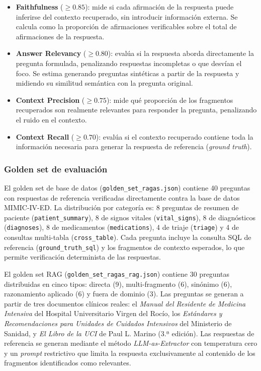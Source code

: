 \begin{itemize}[nosep, leftmargin=*]
  \item \textbf{Faithfulness} ($\geq 0.85$): mide si cada afirmación de la
    respuesta puede inferirse del contexto recuperado, sin introducir
    información externa. Se calcula como la proporción de afirmaciones
    verificables sobre el total de afirmaciones de la respuesta.
  \item \textbf{Answer Relevancy} ($\geq 0.80$): evalúa si la respuesta
    aborda directamente la pregunta formulada, penalizando respuestas
    incompletas o que desvían el foco. Se estima generando preguntas
    sintéticas a partir de la respuesta y midiendo su similitud semántica
    con la pregunta original.
  \item \textbf{Context Precision} ($\geq 0.75$): mide qué proporción de
    los fragmentos recuperados son realmente relevantes para responder la
    pregunta, penalizando el ruido en el contexto.
  \item \textbf{Context Recall} ($\geq 0.70$): evalúa si el contexto
    recuperado contiene toda la información necesaria para generar la
    respuesta de referencia (\textit{ground truth}).
\end{itemize}

\subsubsection{Golden set de evaluación}
\label{sec:golden_set}

El golden set de base de datos (\texttt{golden\_set\_ragas.json}) contiene
40 preguntas con respuestas de referencia verificadas directamente contra
la base de datos MIMIC-IV-ED. La distribución por categoría es:
8 preguntas de resumen de paciente (\texttt{patient\_summary}),
8 de signos vitales (\texttt{vital\_signs}),
8 de diagnósticos (\texttt{diagnoses}),
8 de medicamentos (\texttt{medications}),
4 de triaje (\texttt{triage}) y
4 de consultas multi-tabla (\texttt{cross\_table}).
Cada pregunta incluye la consulta SQL de referencia
(\texttt{ground\_truth\_sql}) y los fragmentos de contexto esperados,
lo que permite verificación determinista de las respuestas.

El golden set RAG (\texttt{golden\_set\_ragas\_rag.json}) contiene
30 preguntas distribuidas en cinco tipos: directa (9), multi-fragmento (6),
sinónimo (6), razonamiento aplicado (6) y fuera de dominio (3).
Las preguntas se generan a partir de tres documentos clínicos reales:
el \textit{Manual del Residente de Medicina Intensiva} del Hospital
Universitario Virgen del Rocío, los \textit{Estándares y Recomendaciones
para Unidades de Cuidados Intensivos} del Ministerio de Sanidad, y
\textit{El Libro de la UCI} de Paul L. Marino (3.ª edición).
Las respuestas de referencia se generan mediante el método
\textit{LLM-as-Extractor} con temperatura cero y un \textit{prompt}
restrictivo que limita la respuesta exclusivamente al contenido de los
fragmentos identificados como relevantes.

